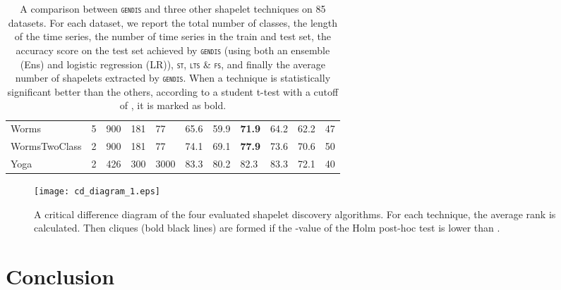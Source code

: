 \documentclass[runningheads]{llncs}
\begin{document}
\begin{table}[t]
\begin{tabular}{>{\tiny}lllll|lllll|l}
		Worms                          & 5         & 900       & 181     & 77     & 65.6 & 59.9          & \textbf{71.9}  & 64.2          & 62.2  & 47          \\
		WormsTwoClass                  & 2         & 900       & 181     & 77     & 74.1 & 69.1          & \textbf{77.9}  & 73.6          & 70.6  & 50          \\
		Yoga                           & 2         & 426       & 300     & 3000   & 83.3 & 80.2          & 82.3           & 83.3          & 72.1  & 40          \\
		
		\bottomrule
	\end{tabular}
	\caption{A comparison between \textsc{\texttt{gendis}} and three other shapelet techniques on 85 datasets. For each dataset, we report the total number of classes, the length of the time series, the number of time series in the train and test set, the accuracy score on the test set achieved by \textsc{\texttt{gendis}} (using both an ensemble (Ens) and logistic regression (LR)), \textsc{\texttt{st}}, \textsc{\texttt{lts}} \& \textsc{\texttt{fs}}, and finally the average number of shapelets extracted by \textsc{\texttt{gendis}}. When a technique is statistically significant better than the others, according to a student t-test with a cutoff of , it is marked as bold.}
	\label{tbl:gendis_all_2}
\end{table}

\begin{figure*}[h!]
	\centering
	\texttt{[image: cd\_diagram\_1.eps]}
	\caption{A critical difference diagram of the four evaluated shapelet discovery algorithms. For each technique, the average rank is calculated. Then cliques (bold black lines) are formed if the -value of the Holm post-hoc test is lower than .}
	\label{fig:critical_difference}      
\end{figure*}

\section{Conclusion}\label{sec:conclusion}
\end{document}

